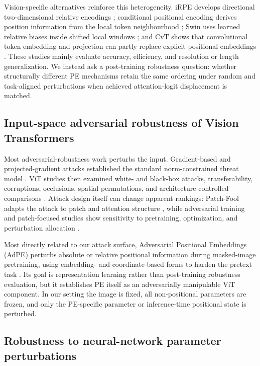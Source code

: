 \documentclass[preprint,12pt,authoryear]{elsarticle}
\begin{document}
Vision-specific alternatives reinforce this heterogeneity. iRPE develops
directional two-dimensional relative encodings \citep{wu2021irpe};
conditional positional encoding derives position information from the local
token neighbourhood \citep{chu2023conditional}; Swin uses learned relative
biases inside shifted local windows \citep{liu2021swin}; and CvT shows that
convolutional token embedding and projection can partly replace explicit
positional embeddings \citep{wu2021cvt}. These studies mainly evaluate
accuracy, efficiency, and resolution or length generalization. We instead
ask a post-training robustness question: whether structurally different PE
mechanisms retain the same ordering under random and task-aligned
perturbations when achieved attention-logit displacement is matched.

\subsection{Input-space adversarial robustness of Vision Transformers}

Most adversarial-robustness work perturbs the input. Gradient-based and
projected-gradient attacks established the standard norm-constrained
threat model \citep{goodfellow2015explaining,madry2018towards}. ViT studies
then examined white- and black-box attacks, transferability, corruptions,
occlusions, spatial permutations, and architecture-controlled comparisons
\citep{mahmood2021robustness,naseer2021intriguing,bai2021transformers}.
Attack design itself can change apparent rankings: Patch-Fool adapts the
attack to patch and attention structure \citep{fu2022patchfool}, while
adversarial training and patch-focused studies show sensitivity to
pretraining, optimization, and perturbation allocation
\citep{mo2022adversarialtraining,liu2023patched}.

Most directly related to our attack surface, Adversarial Positional
Embeddings (AdPE) perturbs absolute or relative positional information
during masked-image pretraining, using embedding- and coordinate-based
forms to harden the pretext task \citep{wang2023adpe}. Its goal is
representation learning rather than post-training robustness evaluation,
but it establishes PE itself as an adversarially manipulable ViT
component. In our setting the image is fixed, all non-positional parameters
are frozen, and only the PE-specific parameter or inference-time positional
state is perturbed.

\subsection{Robustness to neural-network parameter perturbations}
\end{document}
